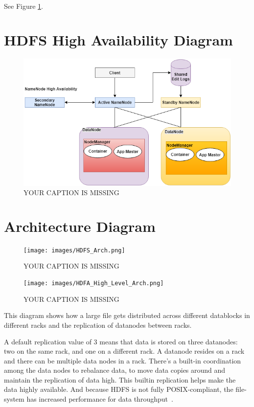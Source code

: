  See Figure \ref{f:hdfs-ha}.

 
\section{HDFS High Availability Diagram} 


\begin{figure}[!ht]
  \centering
\centering\includegraphics[width=\columnwidth]{images/HDFS_HA.png}
  \caption{YOUR CAPTION IS MISSING}\label{f:hdfs-ha}
\end{figure}



\section{Architecture Diagram} 

\begin{figure}[!ht]
\centering\texttt{[image: images/HDFS\_Arch.png]}
  \caption{YOUR CAPTION IS MISSING}\label{f:hdfs-arch}
\end{figure}

\begin{figure}[!ht]
\centering\texttt{[image: images/HDFA\_High\_Level\_Arch.png]}
  \caption{YOUR CAPTION IS MISSING}\label{f:hdfs-level-arch}
\end{figure}


This diagram shows how a large file gets distributed across different
datablocks in different racks and the replication of datanodes between
racks.
 
A default replication value of 3 means that data is stored on three
datanodes: two on the same rack, and one on a different rack. A
datanode resides on a rack and there can be multiple data nodes in a
rack. There's a built-in coordination among the data nodes to
rebalance data, to move data copies around and maintain the
replication of data high. This builtin replication helps make the data
highly available. And because HDFS is not fully POSIX-compliant, the
file-system has increased performance for data
throughput~\cite{hid-sp18-506-hdfs2}.

